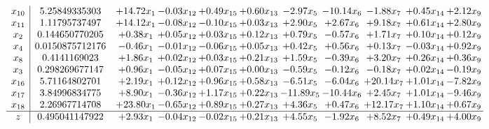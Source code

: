 \documentclass[9pt]{article}
\begin{document}
\[\begin{array}{c| c c@{\hskip 2pt} c@{\hskip 2pt} c@{\hskip 2pt} c@{\hskip 2pt} c@{\hskip 2pt} c@{\hskip 2pt} c@{\hskip 2pt} c@{\hskip 2pt} c@{\hskip 2pt} }
 x_{10}   &  5.25849335303 & + 14.72 x_{1} & -0.03 x_{12} & +  0.49 x_{15} & +  0.60 x_{13} & -2.97 x_{5} & -10.14 x_{6} & -1.88 x_{7} & +  0.45 x_{14} & +  2.12 x_{9}\\
 x_{11}   &  1.11795737497 & + 14.12 x_{1} & -0.08 x_{12} & -0.10 x_{15} & +  0.03 x_{13} & +  2.90 x_{5} & +  2.67 x_{6} & +  9.18 x_{7} & +  0.61 x_{14} & +  2.80 x_{9}\\
 x_{2}   &  0.144650770205 & +  0.38 x_{1} & +  0.05 x_{12} & +  0.03 x_{15} & +  0.12 x_{13} & +  0.79 x_{5} & -0.57 x_{6} & +  1.71 x_{7} & +  0.10 x_{14} & +  0.12 x_{9}\\
 x_{4}   &  0.0150875712176 & -0.46 x_{1} & -0.01 x_{12} & -0.06 x_{15} & +  0.05 x_{13} & +  0.42 x_{5} & +  0.56 x_{6} & +  0.13 x_{7} & -0.03 x_{14} & +  0.92 x_{9}\\
 x_{8}   &  0.4141169023 & +  1.86 x_{1} & +  0.02 x_{12} & +  0.03 x_{15} & +  0.21 x_{13} & +  1.59 x_{5} & -0.39 x_{6} & +  3.20 x_{7} & +  0.26 x_{14} & +  0.36 x_{9}\\
 x_{3}   &  0.298269677147 & +  0.96 x_{1} & -0.05 x_{12} & +  0.07 x_{15} & +  0.00 x_{13} & -0.59 x_{5} & -0.12 x_{6} & -0.18 x_{7} & +  0.02 x_{14} & -0.19 x_{9}\\
 x_{16}   &  5.71164802701 & +  2.19 x_{1} & +  0.12 x_{12} & +  0.96 x_{15} & +  0.58 x_{13} & -6.51 x_{5} & -6.04 x_{6} & + 20.14 x_{7} & +  1.01 x_{14} & -7.82 x_{9}\\
 x_{17}   &  3.84996834775 & +  8.90 x_{1} & -0.36 x_{12} & +  1.17 x_{15} & +  0.22 x_{13} & -11.89 x_{5} & -10.44 x_{6} & +  2.45 x_{7} & +  1.01 x_{14} & -9.46 x_{9}\\
 x_{18}   &  2.26967714708 & + 23.80 x_{1} & -0.65 x_{12} & +  0.89 x_{15} & +  0.27 x_{13} & +  4.36 x_{5} & +  0.47 x_{6} & + 12.17 x_{7} & +  1.10 x_{14} & +  0.67 x_{9}\\
\hline
z    &  0.495041147922 & +  2.93 x_{1} & -0.04 x_{12} & -0.02 x_{15} & +  0.21 x_{13} & +  4.55 x_{5} & -1.92 x_{6} & +  8.52 x_{7} & +  0.49 x_{14} & +  4.00 x_{9}\\
\end{array}\]
\end{document}
